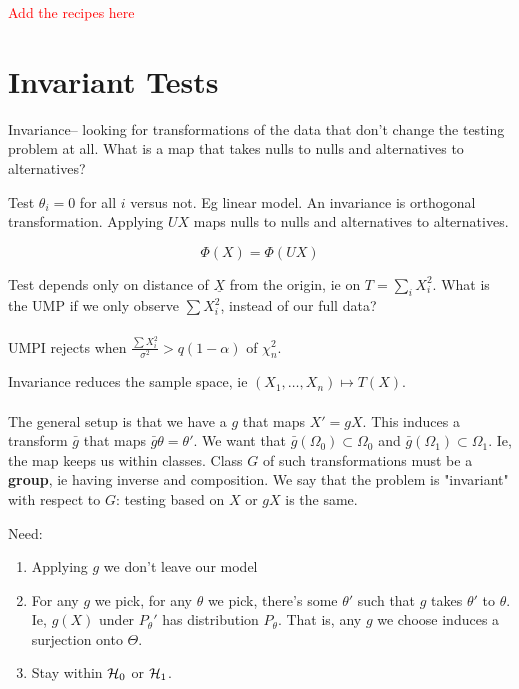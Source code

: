 \documentclass{article}
\newcommand\myworries[1]{\textcolor{red}{#1}}
\begin{document}
\myworries{Add the recipes here}

\begin{example}

\end{example}

\section{Invariant Tests}
Invariance-- looking for transformations of the data that don't change the testing problem at all. What is a map that takes nulls to nulls and alternatives to alternatives? 
\begin{example}
Test $\theta_i=0$ for all $i$ versus not. Eg linear model. An invariance is orthogonal transformation. Applying $UX$ maps nulls to nulls and alternatives to alternatives. 

$$\Phi(X) = \Phi(U X)$$

Test depends only on distance of $\underline X$ from the origin, ie on $T=\sum_i X_i^2$. What is the UMP if we only observe $\sum X_i^2$, instead of our full data?\\\\

UMPI rejects when $\frac{\sum X_i^2}{\sigma^2} > q(1-\alpha)$ of $\chi^2_{n}$.
\end{example}

Invariance reduces the sample space, ie $(X_1, \ldots, X_n) \mapsto T(X)$. \\\\

The general setup is that we have a $g$ that maps $X' = gX$. This induces a transform $\bar g$ that maps $\bar g \theta = \theta'$. We want that $\bar g(\Omega_0)\subset \Omega_0$ and $\bar g(\Omega_1) \subset \Omega_1$. Ie, the map keeps us within classes. Class $G$ of such transformations must be a \textbf{group}, ie having inverse and composition. We say that the problem is "invariant" with respect to $G$: testing based on $X$ or $gX$ is the same. 

Need:
\begin{enumerate}
	\item Applying $g$ we don't leave our model
	\item For any $g$ we pick, for any $\theta$ we pick, there's some $\theta'$ such that $g$ takes $\theta'$ to $\theta$. Ie, $g(X)$ under $P_\theta'$ has distribution $P_\theta$. That is, any $g$ we choose induces a surjection onto $\Theta$. 
	\item Stay within $\mathcal H_0$ or $\mathcal H_1$. 
\end{enumerate}
\end{document}
